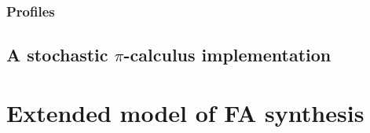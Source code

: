 \subsubsection{Profiles}



\subsection{A stochastic $\pi$-calculus implementation}



\section{Extended model of FA synthesis}

